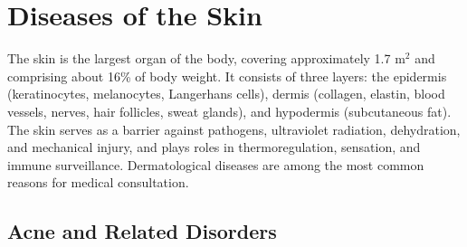 \chapter{Diseases of the Skin}
\label{ch:skin}
The skin is the largest organ of the body, covering approximately 1.7 m$^2$ and comprising about 16\% of body weight. It consists of three layers: the epidermis (keratinocytes, melanocytes, Langerhans cells), dermis (collagen, elastin, blood vessels, nerves, hair follicles, sweat glands), and hypodermis (subcutaneous fat). The skin serves as a barrier against pathogens, ultraviolet radiation, dehydration, and mechanical injury, and plays roles in thermoregulation, sensation, and immune surveillance. Dermatological diseases are among the most common reasons for medical consultation.

\section{Acne and Related Disorders}








\label{sec:Acne and Related Disorders}

